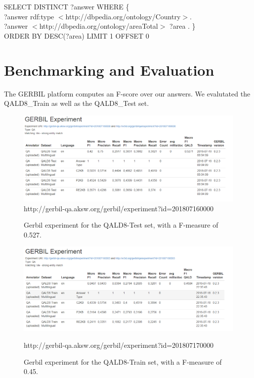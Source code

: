 \documentclass[runningheads]{llncs}
\begin{document}
\raggedbottom
\begin{example}
	SELECT DISTINCT ?answer WHERE \{ \\
	\tab[1.8cm] ?answer rdf:type $<$http://dbpedia.org/ontology/Country$>$. \\
	\tab[1.8cm] ?answer $<$http://dbpedia.org/ontology/areaTotal$>$ ?area . \} \\
	\tab[1.8cm]	ORDER BY DESC(?area) LIMIT 1 OFFSET 0\end{example}

\pagebreak
\section{Benchmarking and Evaluation} 

The GERBIL platform computes an F-score over our answers. We evalutated the QALD8\_Train as well as the QALD8\_Test set.

\begin{figure}[H]
	\includegraphics[width=\textwidth]{QALD-8-Test.PNG}
	http://gerbil-qa.aksw.org/gerbil/experiment?id=201807160000
	\caption{Gerbil experiment for the QALD8-Test set, with a F-measure of 0.527.}
	\label{fig2} 
\end{figure}


\begin{figure}
	\includegraphics[width=\textwidth]{QALD-8-Train.PNG}
	
	http://gerbil-qa.aksw.org/gerbil/experiment?id=201807170000
	\caption{Gerbil experiment for the QALD8-Train set, with a F-measure of 0.45.}
	\label{fig3} 
\end{figure}
\end{document}
